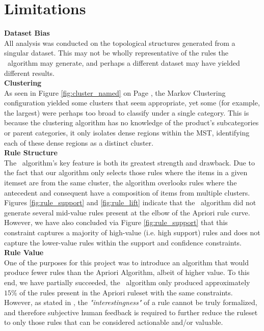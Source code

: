 \section{Limitations}
\textbf{Dataset Bias}\\
All analysis was conducted on the topological structures generated from a singular dataset. This may not be wholly representative of the rules the \algo\ algorithm may generate, and perhaps a different dataset may have yielded different results.
\\\textbf{Clustering}\\
As seen in Figure \ref{fig:cluster_named} on Page \pageref{fig:cluster_named}, the Markov Clustering configuration yielded some clusters that seem appropriate, yet some (for example, the largest) were perhaps too broad to classify under a single category. This is because the clustering algorithm has no knowledge of the product's subcategories or parent categories, it only isolates dense regions within the MST, identifying each of these dense regions as a distinct cluster.
\\\textbf{Rule Structure}\\
The \algo\ algorithm's key feature is both its greatest strength and drawback. Due to the fact that our algorithm only selects those rules where the items in a given itemset are from the same cluster, the algorithm overlooks rules where the antecedent and consequent have a composition of items from multiple clusters. 
Figures \ref{fig:rule_support} and \ref{fig:rule_lift} indicate that the \algo\ algorithm did not generate several mid-value rules present at the elbow of the Apriori rule curve.
However, we have also concluded via Figure \ref{fig:rule_support} that this constraint captures a majority of high-value (i.e. high support) rules and does not capture the lower-value rules within the support and confidence constraints.
\\\textbf{Rule Value}\\
One of the purposes for this project was to introduce an algorithm that would produce fewer rules than the Apriori Algorithm, albeit of higher value. To this end, we have partially succeeded, the \algo\ algorithm only produced approximately $15\%$ of the rules present in the Apriori ruleset with the same constraints. However, as stated in , the \textit{"interestingness"} of a rule cannot be truly formalized, and therefore subjective human feedback is required to further reduce the ruleset to only those rules that can be considered actionable and/or valuable.


